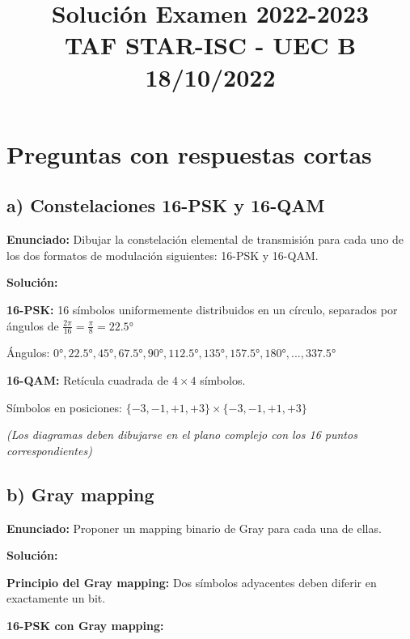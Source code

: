 \documentclass[11pt,a4paper]{article}
\title{\textbf{Soluci\'on Examen 2022-2023\\TAF STAR-ISC - UEC B\\18/10/2022}}
\author{}
\date{}
\begin{document}
\maketitle

\section*{Preguntas con respuestas cortas}

\subsection*{a) Constelaciones 16-PSK y 16-QAM}

\textbf{Enunciado:} Dibujar la constelaci\'on elemental de transmisi\'on para cada uno de los dos formatos de modulaci\'on siguientes: 16-PSK y 16-QAM.

\vspace{0.3cm}
\textbf{Soluci\'on:}

\textbf{16-PSK:} 16 s\'imbolos uniformemente distribuidos en un c\'irculo, separados por \'angulos de $\frac{2\pi}{16} = \frac{\pi}{8} = 22.5°$

\'Angulos: $0°, 22.5°, 45°, 67.5°, 90°, 112.5°, 135°, 157.5°, 180°, ..., 337.5°$

\textbf{16-QAM:} Ret\'icula cuadrada de $4 \times 4$ s\'imbolos.

S\'imbolos en posiciones: $\{-3, -1, +1, +3\} \times \{-3, -1, +1, +3\}$

\textit{(Los diagramas deben dibujarse en el plano complejo con los 16 puntos correspondientes)}



\subsection*{b) Gray mapping}

\textbf{Enunciado:} Proponer un mapping binario de Gray para cada una de ellas.

\vspace{0.3cm}
\textbf{Soluci\'on:}

\textbf{Principio del Gray mapping:} Dos s\'imbolos adyacentes deben diferir en exactamente un bit.

\textbf{16-PSK con Gray mapping:}
\end{document}
